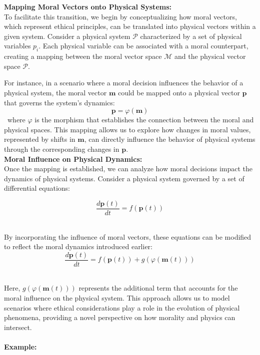 \documentclass{article}
\begin{document}
\textbf{Mapping Moral Vectors onto Physical Systems:}
\\

To facilitate this transition, we begin by conceptualizing how moral vectors, which represent ethical principles, can be translated into physical vectors within a given system. Consider a physical system \( \mathcal{P} \) characterized by a set of physical variables \( p_i \). Each physical variable can be associated with a moral counterpart, creating a mapping between the moral vector space \( \mathcal{M} \) and the physical vector space \( \mathcal{P} \).

For instance, in a scenario where a moral decision influences the behavior of a physical system, the moral vector \( \mathbf{m} \) could be mapped onto a physical vector \( \mathbf{p} \) that governs the system's dynamics:
\[
\mathbf{p} = \varphi(\mathbf{m})
\]
\
where \( \varphi \) is the morphism that establishes the connection between the moral and physical spaces. This mapping allows us to explore how changes in moral values, represented by shifts in \( \mathbf{m} \), can directly influence the behavior of physical systems through the corresponding changes in \( \mathbf{p} \).
\\


\textbf{Moral Influence on Physical Dynamics:}
\\

Once the mapping is established, we can analyze how moral decisions impact the dynamics of physical systems. Consider a physical system governed by a set of differential equations:

\[
\frac{d\mathbf{p}(t)}{dt} = f(\mathbf{p}(t))
\]
\

By incorporating the influence of moral vectors, these equations can be modified to reflect the moral dynamics introduced earlier:
\\

\[
\frac{d\mathbf{p}(t)}{dt} = f(\mathbf{p}(t)) + g(\varphi(\mathbf{m}(t)))
\]
\

Here, \( g(\varphi(\mathbf{m}(t))) \) represents the additional term that accounts for the moral influence on the physical system. This approach allows us to model scenarios where ethical considerations play a role in the evolution of physical phenomena, providing a novel perspective on how morality and physics can intersect.
\\
\\

\textbf{Example:}
\\
\end{document}
